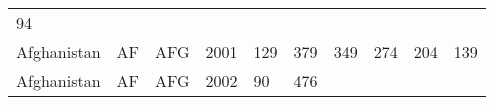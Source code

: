 \documentclass[]{article}
\begin{document}
\begin{longtable}[]{@{}llllllllll@{}}
\begin{minipage}[t]{0.09\columnwidth}
94\strut
\end{minipage}\tabularnewline
\begin{minipage}[t]{0.08\columnwidth}\raggedright
Afghanistan\strut
\end{minipage} & \begin{minipage}[t]{0.04\columnwidth}\raggedright
AF\strut
\end{minipage} & \begin{minipage}[t]{0.04\columnwidth}\raggedright
AFG\strut
\end{minipage} & \begin{minipage}[t]{0.04\columnwidth}\raggedright
2001\strut
\end{minipage} & \begin{minipage}[t]{0.08\columnwidth}\raggedright
129\strut
\end{minipage} & \begin{minipage}[t]{0.09\columnwidth}\raggedright
379\strut
\end{minipage} & \begin{minipage}[t]{0.09\columnwidth}\raggedright
349\strut
\end{minipage} & \begin{minipage}[t]{0.09\columnwidth}\raggedright
274\strut
\end{minipage} & \begin{minipage}[t]{0.09\columnwidth}\raggedright
204\strut
\end{minipage} & \begin{minipage}[t]{0.09\columnwidth}\raggedright
139\strut
\end{minipage}\tabularnewline
\begin{minipage}[t]{0.08\columnwidth}\raggedright
Afghanistan\strut
\end{minipage} & \begin{minipage}[t]{0.04\columnwidth}\raggedright
AF\strut
\end{minipage} & \begin{minipage}[t]{0.04\columnwidth}\raggedright
AFG\strut
\end{minipage} & \begin{minipage}[t]{0.04\columnwidth}\raggedright
2002\strut
\end{minipage} & \begin{minipage}[t]{0.08\columnwidth}\raggedright
90\strut
\end{minipage} & \begin{minipage}[t]{0.09\columnwidth}\raggedright
476\strut
\end{minipage} & \begin{minipage}[t]{0.09\columnwidth}\raggedright

\end{minipage}
\end{longtable}
\end{document}
